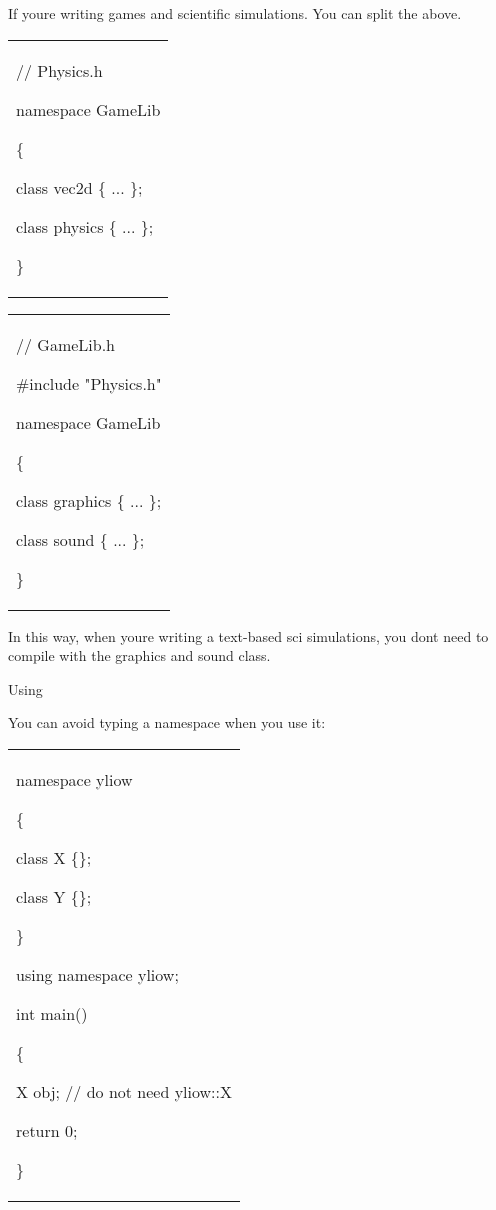 \documentclass[
]{article}
\begin{document}
If you\textquotesingle re writing games and scientific simulations. You
can split the above.

\begin{longtable}[]{@{}
  >{\raggedright\arraybackslash}p{}@{}}
\toprule\noalign{}
 \\
\midrule\noalign{}
\endhead
\bottomrule\noalign{}
\endlastfoot
// Physics.h

namespace GameLib

\{

class vec2d \{ ... \};

class physics \{ ... \};

\} \\
\end{longtable}

\begin{longtable}[]{@{}
  >{\raggedright\arraybackslash}p{}@{}}
\toprule\noalign{}
 \\
\midrule\noalign{}
\endhead
\bottomrule\noalign{}
\endlastfoot
// GameLib.h

\#include "Physics.h"

namespace GameLib

\{

class graphics \{ ... \};

class sound \{ ... \};

\} \\
\end{longtable}

In this way, when you\textquotesingle re writing a text-based sci
simulations, you don\textquotesingle t need to compile with the graphics
and sound class.

Using

You can avoid typing a namespace when you use it:

\begin{longtable}[]{@{}
  >{\raggedright\arraybackslash}p{}@{}}
\toprule\noalign{}
 \\
\midrule\noalign{}
\endhead
\bottomrule\noalign{}
\endlastfoot
namespace yliow

\{

class X \{\};

class Y \{\};

\}

using namespace yliow;

int main()

\{

X obj; // do not need yliow::X

return 0;

\} \\
\end{longtable}
\end{document}
